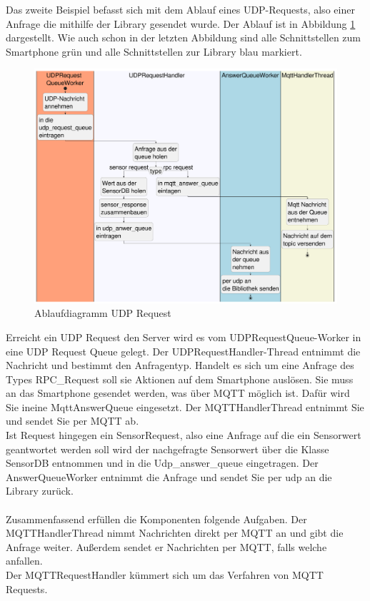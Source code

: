 \documentclass[11pt,a4paper]{report}
\begin{document}
Das zweite Beispiel befasst sich mit dem Ablauf eines UDP-Requests, also einer Anfrage die mithilfe der Library gesendet wurde.
Der Ablauf ist in Abbildung \ref{fig:serverUDPReqPath} dargestellt.
Wie auch schon in der letzten Abbildung sind alle Schnittstellen zum Smartphone grün und alle Schnittstellen zur Library blau markiert.
\begin{figure}[htbp]
  \centering
  \includegraphics[width=.8\textwidth]{images/UDPRequestServerPath}
  \caption{Ablaufdiagramm UDP Request}
  \label{fig:serverUDPReqPath}
\end{figure}
Erreicht ein UDP Request den Server wird es vom UDPRequestQueue-Worker in eine UDP Request Queue gelegt.
Der UDPRequestHandler-Thread entnimmt die Nachricht und bestimmt den Anfragentyp.
Handelt es sich um eine Anfrage des Types RPC\_Request soll sie Aktionen auf dem Smartphone auslösen.
Sie muss an das Smartphone gesendet werden, was über MQTT möglich ist.
Dafür wird Sie ineine MqttAnswerQueue eingesetzt.
Der MQTTHandlerThread entnimmt Sie und sendet Sie per MQTT ab.
\\
Ist Request hingegen ein SensorRequest, also eine Anfrage auf die ein Sensorwert geantwortet werden soll wird der nachgefragte Sensorwert über die Klasse SensorDB entnommen und in die Udp\_answer\_queue eingetragen.
Der AnswerQueueWorker entnimmt die Anfrage und sendet Sie per udp an die Library zurück.
\\\\
Zusammenfassend erfüllen die Komponenten folgende Aufgaben.
Der MQTTHandlerThread nimmt Nachrichten direkt per MQTT an und gibt die Anfrage weiter.
Außerdem sendet er Nachrichten per MQTT, falls welche anfallen.
\\
Der MQTTRequestHandler kümmert sich um das Verfahren von MQTT Requests.
\end{document}
